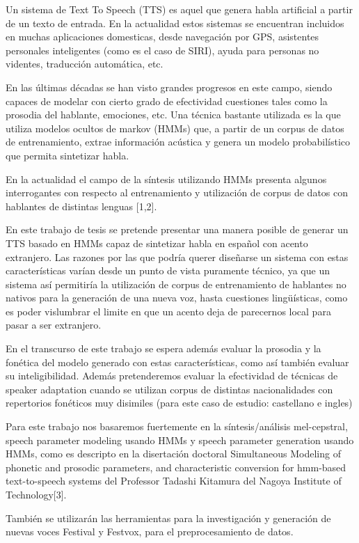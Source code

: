 

Un sistema de Text To Speech (TTS) es aquel que genera habla artificial a partir de un texto de entrada. En la actualidad estos sistemas se encuentran incluidos en muchas aplicaciones domesticas, desde navegación por GPS, asistentes personales inteligentes (como es el caso de SIRI), ayuda para personas no videntes, traducción automática, etc.

En las últimas décadas se han visto grandes progresos en este campo, siendo capaces de modelar con cierto grado de efectividad cuestiones tales como la prosodia del hablante, emociones, etc. Una técnica bastante utilizada es la que utiliza modelos ocultos de markov (HMMs) que, a partir de un corpus de datos de entrenamiento, extrae información acústica y genera un modelo probabilístico que permita sintetizar habla. 


En la actualidad el campo de la síntesis utilizando HMMs presenta algunos interrogantes con respecto al entrenamiento y utilización de corpus de datos con hablantes de distintas lenguas [1,2]. 

En este trabajo de tesis se pretende presentar una manera posible de generar un TTS basado en HMMs capaz de sintetizar habla en español con acento extranjero. Las razones por las que podría querer diseñarse un sistema con estas características varían desde un punto de vista puramente técnico, ya que un sistema así permitiría la utilización de corpus de entrenamiento de hablantes no nativos para la generación de una nueva voz, hasta cuestiones lingüísticas, como es poder vislumbrar el limite en que un acento deja de parecernos local para pasar a ser extranjero.

En el transcurso de este trabajo se espera además evaluar la prosodia y la fonética del modelo generado con estas características, como así también evaluar su inteligibilidad. Además pretenderemos evaluar la efectividad de técnicas de speaker adaptation cuando se utilizan corpus de distintas nacionalidades con repertorios fonéticos muy disimiles (para este caso de estudio: castellano e ingles)

Para este trabajo nos basaremos fuertemente en la síntesis/análisis mel-cepstral, speech parameter modeling usando HMMs y speech parameter generation usando HMMs, como es descripto en la disertación doctoral Simultaneous Modeling of phonetic and prosodic parameters, and characteristic conversion for hmm-based text-to-speech systems del Professor Tadashi Kitamura del Nagoya Institute of Technology[3].

También se utilizarán las herramientas para la investigación y generación de nuevas voces Festival y Festvox, para el preprocesamiento de datos.
